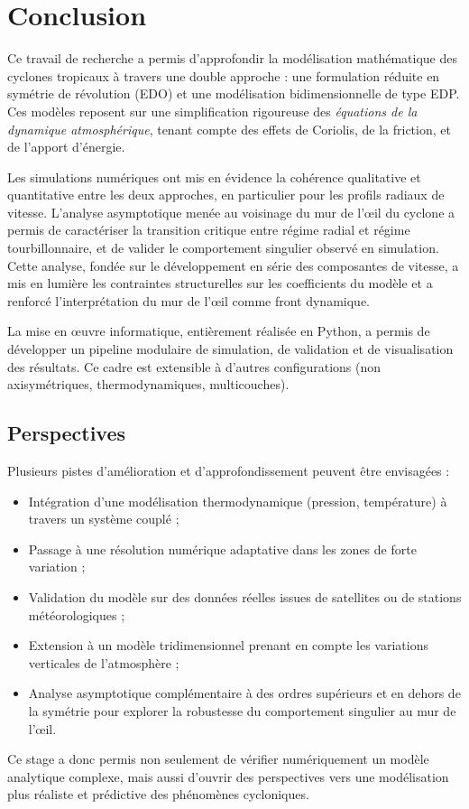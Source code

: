 \chapter{Conclusion}

Ce travail de recherche a permis d'approfondir la mod\'elisation math\'ematique des cyclones tropicaux \`a travers une double approche : une formulation r\'eduite en sym\'etrie de r\'evolution (EDO) et une mod\'elisation bidimensionnelle de type EDP. Ces mod\`eles reposent sur une simplification rigoureuse des \textit{\'equations de la dynamique atmosph\'erique}, tenant compte des effets de Coriolis, de la friction, et de l'apport d'\'energie.

Les simulations num\'eriques ont mis en \'evidence la coh\'erence qualitative et quantitative entre les deux approches, en particulier pour les profils radiaux de vitesse. L'analyse asymptotique men\'ee au voisinage du mur de l'\oe il du cyclone a permis de caract\'eriser la transition critique entre r\'egime radial et r\'egime tourbillonnaire, et de valider le comportement singulier observ\'e en simulation. Cette analyse, fond\'ee sur le d\'eveloppement en s\'erie des composantes de vitesse, a mis en lumi\`ere les contraintes structurelles sur les coefficients du mod\`ele et a renforc\'e l'interpr\'etation du mur de l'\oe il comme front dynamique.

La mise en \oe uvre informatique, enti\`erement r\'ealis\'ee en Python, a permis de d\'evelopper un pipeline modulaire de simulation, de validation et de visualisation des r\'esultats. Ce cadre est extensible \`a d'autres configurations (non axisym\'etriques, thermodynamiques, multicouches).

\section*{Perspectives}

Plusieurs pistes d'am\'elioration et d'approfondissement peuvent \^etre envisag\'ees :
\begin{itemize}
    \item Int\'egration d'une mod\'elisation thermodynamique (pression, temp\'erature) \`a travers un syst\`eme coupl\'e ;
    \item Passage \`a une r\'esolution num\'erique adaptative dans les zones de forte variation ;
    \item Validation du mod\`ele sur des donn\'ees r\'eelles issues de satellites ou de stations m\'et\'eorologiques ;
    \item Extension \`a un mod\`ele tridimensionnel prenant en compte les variations verticales de l'atmosph\`ere ;
    \item Analyse asymptotique compl\'ementaire \`a des ordres sup\'erieurs et en dehors de la sym\'etrie pour explorer la robustesse du comportement singulier au mur de l'\oe il.
\end{itemize}

\medskip

Ce stage a donc permis non seulement de v\'erifier num\'eriquement un mod\`ele analytique complexe, mais aussi d'ouvrir des perspectives vers une mod\'elisation plus r\'ealiste et pr\'edictive des ph\'enom\`enes cycloniques.
